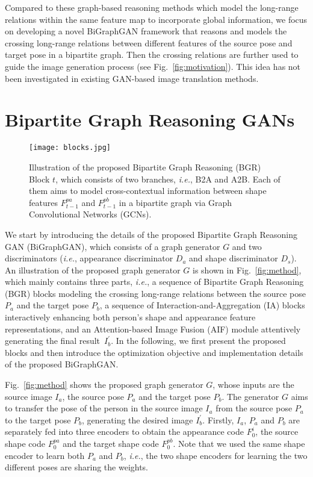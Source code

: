 \documentclass{bmvc2k}
\begin{document}
Compared to these graph-based reasoning methods which model the long-range relations within the same feature map to incorporate global information, we focus on developing a novel BiGraphGAN framework that reasons and models the crossing long-range relations between different features of the source pose and target pose in a bipartite graph.
Then the crossing relations are further used to guide the image generation process (see Fig.~\ref{fig:motivation}). 
This idea has not been investigated in existing GAN-based image translation methods.

 \section{Bipartite Graph Reasoning GANs}

\begin{figure}[!t]
	\centering
	\texttt{[image: blocks.jpg]}
	\caption{Illustration of the proposed Bipartite Graph Reasoning (BGR) Block $t$, which consists of two branches, \emph{i.e.}, B2A and A2B. Each of them aims to model cross-contextual information between shape features $F_{t-1}^{pa}$ and $F_{t-1}^{pb}$ in a bipartite graph via Graph Convolutional Networks (GCNs).}
	\label{fig:blocks}
\end{figure}

We start by introducing the details of the proposed Bipartite Graph Reasoning GAN (BiGraphGAN), which consists of a graph generator $G$ and two discriminators (\emph{i.e.}, appearance discriminator $D_a$ and shape discriminator $D_s$).
An illustration of the proposed graph generator $G$ is shown in Fig.~\ref{fig:method}, which mainly contains three parts, \emph{i.e.}, a sequence of Bipartite Graph Reasoning (BGR) blocks modeling the crossing long-range relations between the source pose $P_a$ and the target pose $P_b$, a sequence of Interaction-and-Aggregation (IA) blocks interactively enhancing both person's shape and appearance feature representations, and an Attention-based Image Fusion (AIF) module attentively generating the final result~$I_b^{'}$.
In the following, we first present the proposed blocks and then introduce the optimization objective and implementation details of the proposed BiGraphGAN.

Fig.~\ref{fig:method} shows the proposed graph generator $G$, whose inputs are the source image $I_a$, the source pose $P_a$ and the target pose $P_b$.
The generator $G$ aims to transfer the pose of the person in the source image $I_a$ from the source pose $P_a$ to the target pose $P_b$, generating the desired image $I_b^{'}$.
Firstly, $I_a$, $P_a$ and $P_b$ are separately fed into three encoders to obtain the appearance code $F_0^i$, the source shape code $F_0^{pa}$ and the target shape code $F_0^{pb}$.
Note that we used the same shape encoder to learn both $P_a$ and $P_b$, \emph{i.e.}, the two shape encoders for learning the two different poses are sharing the weights.
\end{document}

